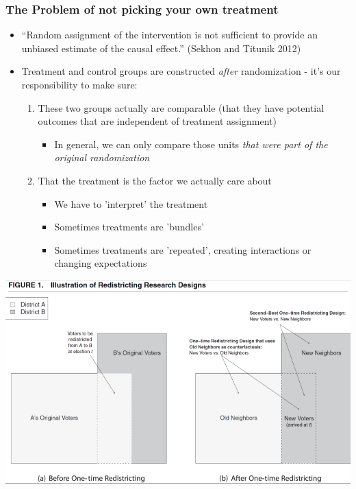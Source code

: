 \documentclass[xcolor=x11names,compress]{beamer}\usepackage[]{graphicx}\usepackage[]{color}
\renewcommand{\(}{\begin{columns}}
\renewcommand{\)}{\end{columns}}
\newcommand{\<}[1]{\begin{column}{#1}}
\renewcommand{\>}{\end{column}}
\begin{document}


\begin{frame}
\frametitle{The Problem of not picking your own treatment}
\begin{itemize}
\item ``Random assignment of the intervention is not sufficient to provide an unbiased estimate of the causal effect.'' (Sekhon and Titunik 2012)
\pause
\item Treatment and control groups are constructed \textit{after} randomization - it's our responsibility to make sure:
\pause
\begin{enumerate}
\item These two groups actually  are comparable (that they have potential outcomes that are independent of treatment assignment)
\begin{itemize}
\item In general, we can only compare those units \textit{that were part of the original randomization}
\end{itemize}
\pause
\item That the treatment is the factor we actually care about
\pause
\begin{itemize}
\item We have to 'interpret' the treatment
\pause
\item Sometimes treatments are 'bundles'
\pause
\item Sometimes treatments are 'repeated', creating interactions or changing expectations
\end{itemize}
\end{enumerate}
\end{itemize}
\end{frame}

\includegraphics[scale=0.45]{Sekhon_redistricting.png}
\end{document}
